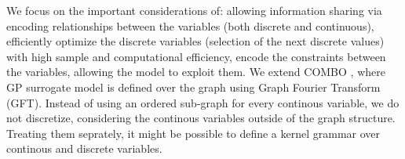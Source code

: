 \documentclass[
    american,a4paper
    ]{scrartcl}
\newcommand{\lang}{en}
\begin{document}
\begin{description}[style=unboxed]
            \item [\questionThree{\lang}]
                We focus on the important considerations of: allowing information sharing via encoding relationships between the variables (both discrete and continuous),
                efficiently optimize the discrete variables (selection of the next discrete values) with high sample and computational efficiency,
                encode the constraints between the variables, allowing the model to exploit them. 
                We extend COMBO \cite{oh2019combinatorial}, where GP surrogate model is defined over the graph using Graph Fourier Transform (GFT).
                Instead of using an ordered sub-graph for every continous variable, we do not discretize, considering the continous variables outside of the graph structure.
                Treating them seprately, it might be possible to define a kernel grammar over continous and discrete variables.


\end{description}
\end{document}

